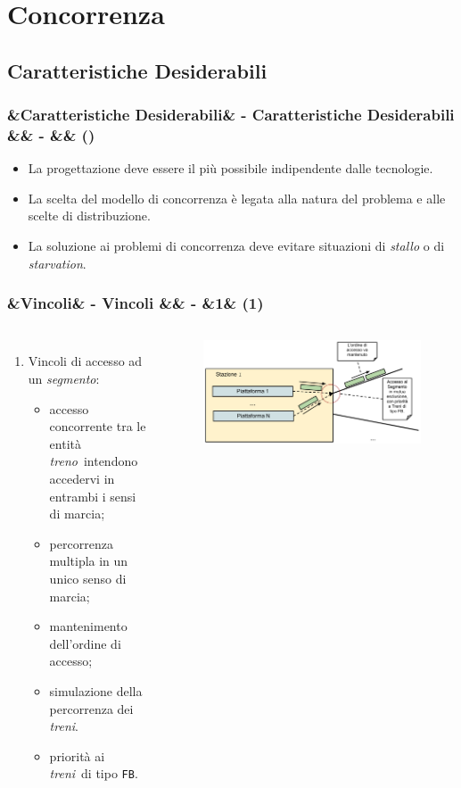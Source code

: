 \documentclass[slidestop,compress,blackandwhite]{beamer}
\newcommand{\ttt}[1]{\texttt{#1}}
\newcommand{\ii}[1]{\textit{#1}}
\newcommand{\treno}{\ii{treno}}
\newcommand{\treni}{\ii{treni}}
\newcommand{\segmento}{\ii{segmento}}
\newcommand{\cm}[1]{\vspace{#1cm}}
\newcommand{\newtitle}[4]{
	#1 
	\ifx&#2&%
	\else
  		\large- #2
	\fi
	\ifx&#3&%
	\else
  		\normalsize- #3
	\fi
	\ifx&#4&%
	\else
  		\normalsize (#4)
	\fi
}
\newcommand{\newframe}[5]{
	\begin{frame}
		\frametitle{\newtitle{#1}{#2}{#3}{#4}}
		#5
	\end{frame}
}
\newcommand{\myitemize}[1]{\begin{itemize}#1\end{itemize}}
\begin{document}
\section{Concorrenza}\label{concurrency}

	\subsection{Caratteristiche Desiderabili}
	\newframe{}{Caratteristiche Desiderabili}{}{}{
		\cm{0.5}
		\myitemize{
			\item La progettazione deve essere il più possibile indipendente dalle tecnologie.
			\cm{0.5}
			\item La scelta del modello di concorrenza è legata alla natura del problema e alle scelte di distribuzione.
			\cm{0.5}
			\item La soluzione ai problemi di concorrenza deve evitare situazioni di \ii{stallo} o di \ii{starvation}.
		}
	}
	
		\newframe{}{Vincoli}{}{1}{
		
		\begin{columns}[c]
		\column{0.5\textwidth}
		\begin{enumerate}
			\item Vincoli di accesso ad un \segmento:
				\myitemize{
					\item accesso concorrente tra le entità \treno~intendono accedervi in entrambi i sensi di marcia;
					\item percorrenza multipla in un unico senso di marcia;
					\item mantenimento dell'ordine di accesso;
					\item simulazione della percorrenza dei \treni.
					\item priorità ai \treni~di tipo \ttt{FB}.
				}
		\end{enumerate}
		\column{0.5\textwidth}
		\begin{figure}
			\includegraphics[scale=0.26,trim=0mm 5mm 0mm 35mm]{imgs/ingresso_segmento.pdf}
		\end{figure}
		\end{columns}
	}
	
\end{document}

